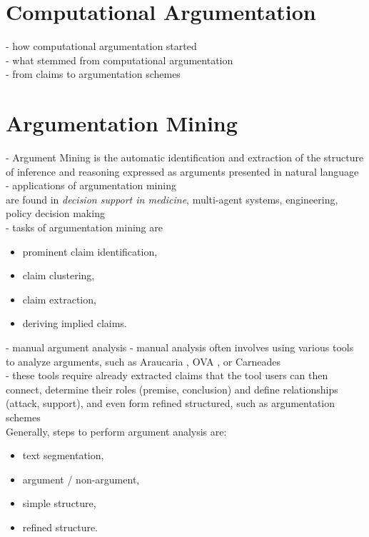 \chapter{Computational Argumentation}

- how computational argumentation started \\
- what stemmed from computational argumentation \\
- from claims to argumentation schemes \\

\chapter{Argumentation Mining}

- Argument Mining is the automatic identification and extraction of the structure
of inference and reasoning expressed as arguments presented in natural language
\citep{lawrence2019argument} \\
- applications of argumentation mining \\
are found in \textit{decision support in medicine}, multi-agent systems, engineering, 
policy decision making \citep{tremblay2016value, byron2019evaluating} \\

\noindent - tasks of argumentation mining are 
\begin{itemize}
\item prominent claim identification,
\item claim clustering,
\item claim extraction,
\item deriving implied claims.
\end{itemize}

\noindent - manual argument analysis \citep{lawrence2019argument}
- manual analysis often involves using various tools to analyze arguments, 
such as Araucaria \citep{reed2004araucaria}, OVA \citep{reed2014ova+}, or
Carneades \citep{gordon2007carneades} \\
- these tools require already extracted claims that the tool users can then 
connect, determine their roles (premise, conclusion) and define 
relationships (attack, support), and even form refined structured,
such as argumentation schemes \citep{walton2008argumentation} \\
Generally, steps to perform argument analysis are:
\begin{itemize}
\item text segmentation,
\item argument / non-argument,
\item simple structure,
\item refined structure.
\end{itemize}

